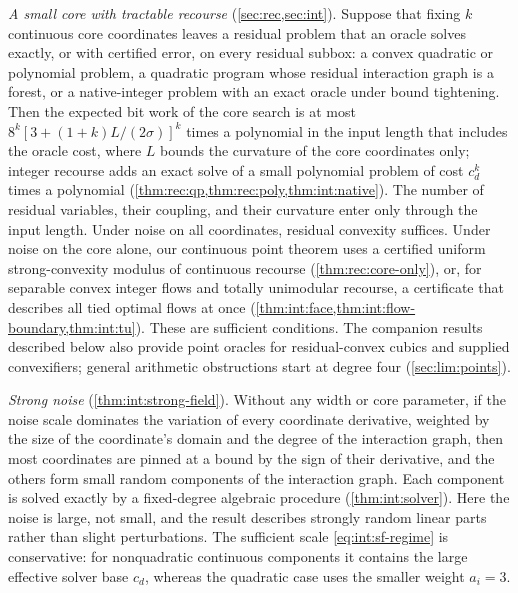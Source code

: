 \emph{A small core with tractable recourse} (\cref{sec:rec,sec:int}).
Suppose that fixing $k$ continuous core coordinates leaves a residual
problem that an oracle solves exactly, or with certified error, on every
residual subbox: a convex quadratic or polynomial problem, a quadratic
program whose residual interaction graph is a forest, or a native-integer
problem with an exact oracle under bound tightening. Then the expected bit
work of the core search is at most $8^k[3+(1+k)L/(2\sigma)]^k$ times a
polynomial in the input length that includes the oracle cost, where $L$
bounds the curvature of the core coordinates only; integer recourse adds an
exact solve of a small polynomial problem of cost $c_d^k$ times a polynomial
(\cref{thm:rec:qp,thm:rec:poly,thm:int:native}). The number of residual
variables, their coupling, and their curvature enter only through the input
length. Under noise on all coordinates, residual convexity suffices. Under
noise on the core alone, our continuous point theorem uses a certified uniform
strong-convexity modulus of continuous recourse (\cref{thm:rec:core-only}),
or, for separable convex integer flows and totally unimodular recourse, a
certificate that describes all tied optimal flows at once
(\cref{thm:int:face,thm:int:flow-boundary,thm:int:tu}).
These are sufficient conditions. The companion results described below
also provide point oracles for residual-convex cubics and supplied
convexifiers; general arithmetic obstructions start at degree four
(\cref{sec:lim:points}).

\emph{Strong noise} (\cref{thm:int:strong-field}). Without any width or core
parameter, if the noise scale dominates the variation of every coordinate
derivative, weighted by the size of the coordinate's domain and the degree
of the interaction graph, then most coordinates are pinned at a bound by the
sign of their derivative, and the others form small random components of
the interaction graph. Each component is solved exactly by a fixed-degree
algebraic procedure (\cref{thm:int:solver}). Here the noise is large, not
small, and the result describes strongly random linear parts rather than
slight perturbations. The sufficient scale \eqref{eq:int:sf-regime} is
conservative: for nonquadratic continuous components it contains the large
effective solver base $c_d$, whereas the quadratic case uses the smaller
weight $a_i=3$.

